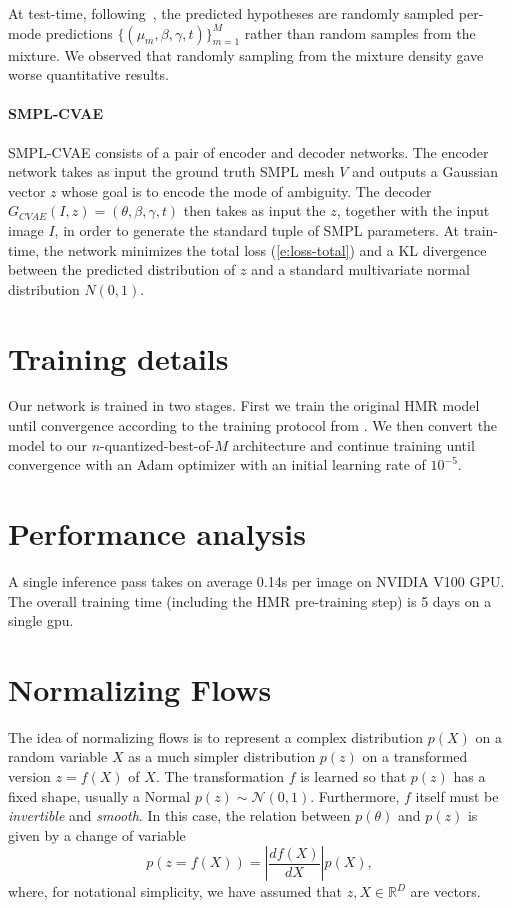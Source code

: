 At test-time, following~\cite{li19generating}, the predicted hypotheses are randomly sampled per-mode predictions $\{(\mu_m, \beta, \gamma, t)\}_{m=1}^M$ rather than random samples from the mixture. We observed that randomly sampling from the mixture density gave worse quantitative results.

\paragraph{SMPL-CVAE} SMPL-CVAE consists of a pair of encoder and decoder networks. The encoder network takes as input the ground truth SMPL mesh $V$ and outputs a Gaussian vector $z$ whose goal is to encode the mode of ambiguity. The decoder $G_{CVAE}(I, z) = (\theta, \beta, \gamma, t)$ then takes as input the $z$, together with the input image $I$, in order to generate the standard tuple of SMPL parameters. At train-time, the network minimizes the total loss (\ref{e:loss-total}) and a KL divergence between the predicted distribution of $z$ and a standard multivariate normal distribution $N(0,1)$.

\section{Training details} \label{s:supp_training}
Our network is trained in two stages. First we train the original HMR model until convergence according to the training protocol from \cite{kolotouros19convolutional}. We then convert the model to our $n$-quantized-best-of-$M$ architecture and continue training until convergence
with an Adam optimizer with an initial learning rate of $10^{-5}$.

\section{Performance analysis} \label{s:supp_perf}
A single inference pass takes on average 0.14s per image on NVIDIA V100 GPU. The overall training time (including the HMR pre-training step) is 5 days on a single gpu.

\section{Normalizing Flows} \label{s:supp_nflow}

The idea of normalizing flows is to represent a complex distribution $p(X)$ on a random variable $X$ as a much simpler distribution $p(z)$ on a transformed version $z=f(X)$ of $X$.
The transformation $f$ is learned so that $p(z)$ has a fixed shape, usually a Normal $p(z) \sim \mathcal{N}(0,1)$.
Furthermore, $f$ itself must be \emph{invertible} and \emph{smooth}.
In this case, the relation between $p(\theta)$ and $p(z)$ is given by a change of variable
$$
 p(z = f(X)) =  \left| \frac{df(X)}{dX} \right| p(X),
$$
where, for notational simplicity, we have assumed that $z,X\in\mathbb{R}^D$ are vectors.

